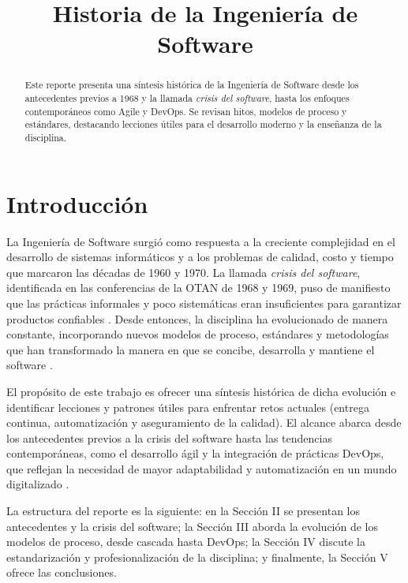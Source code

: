 \documentclass[conference]{IEEEtran}
\title{Historia de la Ingeniería de Software}
\author{
  \IEEEauthorblockN{Angel Luis Valdés Sánchez}
  \IEEEauthorblockA{Universidad Tecnológica de la Mixteca\\
  Huajuapan de León, Oaxaca, México\\
  \texttt{angelluis2605@gs.utm.mx}}
}
\begin{document}
\maketitle

\begin{abstract}
Este reporte presenta una síntesis histórica de la Ingeniería de Software desde los antecedentes previos a 1968 y la llamada \emph{crisis del software}, hasta los enfoques contemporáneos como Agile y DevOps. Se revisan hitos, modelos de proceso y estándares, destacando lecciones útiles para el desarrollo moderno y la enseñanza de la disciplina.
\end{abstract}


\section{Introducción}

La Ingeniería de Software surgió como respuesta a la creciente complejidad en el desarrollo de sistemas informáticos y a los problemas de calidad, costo y tiempo que marcaron las décadas de 1960 y 1970. La llamada \emph{crisis del software}, identificada en las conferencias de la OTAN de 1968 y 1969, puso de manifiesto que las prácticas informales y poco sistemáticas eran insuficientes para garantizar productos confiables \cite{booch2018history}. Desde entonces, la disciplina ha evolucionado de manera constante, incorporando nuevos modelos de proceso, estándares y metodologías que han transformado la manera en que se concibe, desarrolla y mantiene el software \cite{sommerville10e}.

El propósito de este trabajo es ofrecer una síntesis histórica de dicha evolución e identificar lecciones y patrones útiles para enfrentar retos actuales (entrega continua, automatización y aseguramiento de la calidad). El alcance abarca desde los antecedentes previos a la crisis del software hasta las tendencias contemporáneas, como el desarrollo ágil y la integración de prácticas DevOps, que reflejan la necesidad de mayor adaptabilidad y automatización en un mundo digitalizado \cite{pressman2019}.

La estructura del reporte es la siguiente: en la Sección II se presentan los antecedentes y la crisis del software; la Sección III aborda la evolución de los modelos de proceso, desde cascada hasta DevOps; la Sección IV discute la estandarización y profesionalización de la disciplina; y finalmente, la Sección V ofrece las conclusiones.
\end{document}

